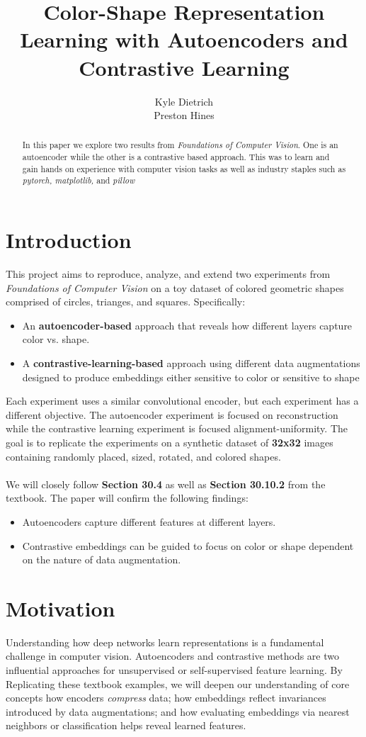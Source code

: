 \documentclass{article}
\title{Color-Shape Representation Learning with Autoencoders and Contrastive Learning}
\author
{
    Kyle Dietrich \\
    \And
    Preston Hines \\
}
\begin{document}
\maketitle
\begin{abstract}
    In this paper we explore two results from \textit{Foundations of Computer Vision}. 
    One is an autoencoder while the other is a contrastive based approach. 
    This was to learn and gain hands on experience with computer vision tasks as well as industry staples such as \textit{pytorch, matplotlib,} and \textit{pillow}
\end{abstract}
\section{Introduction}
This project aims to reproduce, analyze, and extend two experiments from \textit{Foundations of Computer Vision} on a toy dataset of colored geometric shapes comprised of circles, trianges, and squares.
Specifically:
\begin{itemize}
    \item An \textbf{autoencoder-based} approach that reveals how different layers capture color vs. shape.
    \item A \textbf{contrastive-learning-based} approach using different data augmentations designed to produce embeddings either sensitive to color or sensitive to shape
\end{itemize}
Each experiment uses a similar convolutional encoder, but each experiment has a different objective.
The autoencoder experiment is focused on reconstruction while the contrastive learning experiment is focused alignment-uniformity.
The goal is to replicate the experiments on a synthetic dataset of \textbf{32x32} images containing randomly placed, sized, rotated, and colored shapes.
\\\\
We will closely follow \textbf{Section 30.4} as well as \textbf{Section 30.10.2} from the textbook.
The paper will confirm the following findings:
\begin{itemize}
    \item Autoencoders capture different features at different layers.
    \item Contrastive embeddings can be guided to focus on color or shape dependent on the nature of data augmentation.
\end{itemize}
\section{Motivation}
Understanding how deep networks learn representations is a fundamental challenge in computer vision.
Autoencoders and contrastive methods are two influential approaches for unsupervised or self-supervised feature learning.
By Replicating these textbook examples, we will deepen our understanding of core concepts\textemdash
how encoders \textit{compress} data;
how embeddings reflect invariances introduced by data augmentations;
and how evaluating embeddings via nearest neighbors or classification helps reveal learned features.
\end{document}
